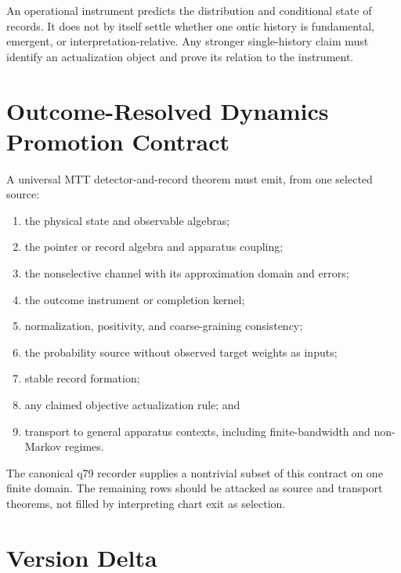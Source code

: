 \documentclass[11pt]{article}
\begin{document}
An operational instrument predicts the distribution and conditional state of
records.  It does not by itself settle whether one ontic history is
fundamental, emergent, or interpretation-relative.  Any stronger
single-history claim must identify an actualization object and prove its
relation to the instrument.

\section{Outcome-Resolved Dynamics Promotion Contract}

A universal MTT detector-and-record theorem must emit, from one selected
source:
\begin{enumerate}[label=\arabic*.]
\item the physical state and observable algebras;
\item the pointer or record algebra and apparatus coupling;
\item the nonselective channel with its approximation domain and errors;
\item the outcome instrument or completion kernel;
\item normalization, positivity, and coarse-graining consistency;
\item the probability source without observed target weights as inputs;
\item stable record formation;
\item any claimed objective actualization rule; and
\item transport to general apparatus contexts, including finite-bandwidth and
  non-Markov regimes.
\end{enumerate}

The canonical q79 recorder supplies a nontrivial subset of this contract on
one finite domain.  The remaining rows should be attacked as source and
transport theorems, not filled by interpreting chart exit as selection.

\section{Version Delta}
\end{document}
